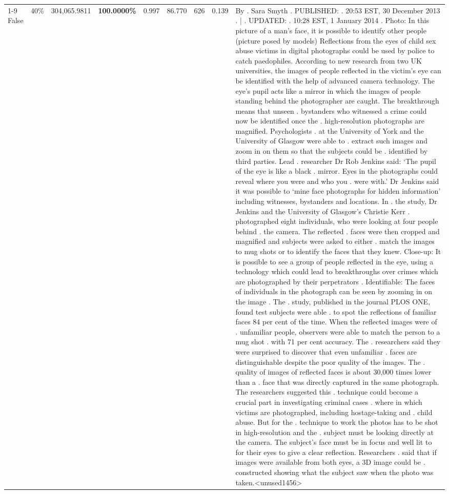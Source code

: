 \begin{table}[H]
\begin{tabular}{lllrlllll}
\cline{1-9} \cline{2-9}
False & 40\% & 304,065.9811 & \bfseries \color{red} 100.0000\% & 0.997 & 86.770 & 626 & 0.139 & By . Sara Smyth . PUBLISHED: . 20:53 EST, 30 December 2013 . | . UPDATED: . 10:28 EST, 1 January 2014 . Photo: In this picture of a man's face, it is possible to identify other people (picture posed by models) Reflections from the eyes of child sex abuse victims in digital photographs could be used by police to catch paedophiles. According to new research from two UK universities, the images of people reflected in the victim's eye can be identified with the help of advanced camera technology. The eye's pupil acts like a mirror in which the images of people standing behind the photographer are caught. The breakthrough means that unseen . bystanders who witnessed a crime could now be identified once the . high-resolution photographs are magnified. Psychologists . at the University of York and the University of Glasgow were able to . extract such images and zoom in on them so that the subjects could be . identified by third parties. Lead . researcher Dr Rob Jenkins said: ‘The pupil of the eye is like a black . mirror. Eyes in the photographs could reveal where you were and who you . were with.' Dr Jenkins said it was possible to ‘mine face photographs for hidden information' including witnesses, bystanders and locations. In . the study, Dr Jenkins and the University of Glasgow's Christie Kerr . photographed eight individuals, who were looking at four people behind . the camera. The reflected . faces were then cropped and magnified and subjects were asked to either . match the images to mug shots or to identify the faces that they knew. Close-up: It is possible to see a group of people reflected in the eye, using a technology which could lead to breakthroughs over crimes which are photographed by their perpetrators . Identifiable: The faces of individuals in the photograph can be seen by zooming in on the image . The . study, published in the journal PLOS ONE, found test subjects were able . to spot the reflections of familiar faces 84 per cent of the time. When the reflected images were of . unfamiliar people, observers were able to match the person to a mug shot . with 71 per cent accuracy. The . researchers said they were surprised to discover that even unfamiliar . faces are distinguishable despite the poor quality of the images. The . quality of images of reflected faces is about 30,000 times lower than a . face that was directly captured in the same photograph. The researchers suggested this . technique could become a crucial part in investigating criminal cases . where in which victims are photographed, including hostage-taking and . child abuse. But for the . technique to work the photos has to be shot in high-resolution and the . subject must be looking directly at the camera. The subject's face must be in focus and well lit to for their eyes to give a clear reflection. Researchers . said that if images were available from both eyes, a 3D image could be . constructed showing what the subject saw when the photo was taken.<unused1456> \\

\end{tabular}
\end{table}
